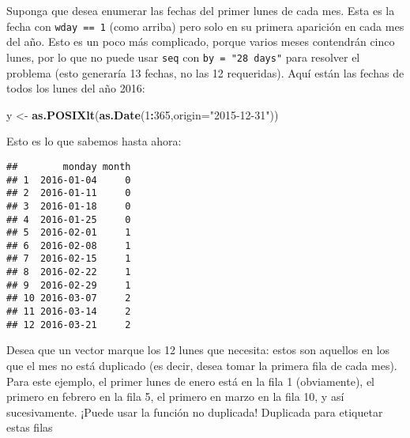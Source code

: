 \documentclass[]{article}
\newenvironment{Shaded}{\begin{snugshade}}{\end{snugshade}}
\newcommand{\KeywordTok}[1]{\textcolor[rgb]{0.13,0.29,0.53}{\textbf{#1}}}
\newcommand{\DataTypeTok}[1]{\textcolor[rgb]{0.13,0.29,0.53}{#1}}
\newcommand{\DecValTok}[1]{\textcolor[rgb]{0.00,0.00,0.81}{#1}}
\newcommand{\StringTok}[1]{\textcolor[rgb]{0.31,0.60,0.02}{#1}}
\newcommand{\OperatorTok}[1]{\textcolor[rgb]{0.81,0.36,0.00}{\textbf{#1}}}
\newcommand{\NormalTok}[1]{#1}
\begin{document}
Suponga que desea enumerar las fechas del primer lunes de cada mes. Esta
es la fecha con \texttt{wday\ ==\ 1} (como arriba) pero solo en su
primera aparición en cada mes del año. Esto es un poco más complicado,
porque varios meses contendrán cinco lunes, por lo que no puede usar
\texttt{seq} con \texttt{by\ =\ "28\ days"} para resolver el problema
(esto generaría 13 fechas, no las 12 requeridas). Aquí están las fechas
de todos los lunes del año 2016:

\begin{Shaded}
\begin{Highlighting}[]
\NormalTok{y <-}\StringTok{ }\KeywordTok{as.POSIXlt}\NormalTok{(}\KeywordTok{as.Date}\NormalTok{(}\DecValTok{1}\OperatorTok{:}\DecValTok{365}\NormalTok{,}\DataTypeTok{origin=}\StringTok{"2015-12-31"}\NormalTok{))}
\end{Highlighting}
\end{Shaded}

Esto es lo que sabemos hasta ahora:

\begin{Shaded}
\end{Shaded}

\begin{verbatim}
##        monday month
## 1  2016-01-04     0
## 2  2016-01-11     0
## 3  2016-01-18     0
## 4  2016-01-25     0
## 5  2016-02-01     1
## 6  2016-02-08     1
## 7  2016-02-15     1
## 8  2016-02-22     1
## 9  2016-02-29     1
## 10 2016-03-07     2
## 11 2016-03-14     2
## 12 2016-03-21     2
\end{verbatim}

Desea que un vector marque los 12 lunes que necesita: estos son aquellos
en los que el mes no está duplicado (es decir, desea tomar la primera
fila de cada mes). Para este ejemplo, el primer lunes de enero está en
la fila 1 (obviamente), el primero en febrero en la fila 5, el primero
en marzo en la fila 10, y así sucesivamente. ¡Puede usar la función no
duplicada! Duplicada para etiquetar estas filas

\begin{Shaded}
\end{Shaded}
\end{document}
